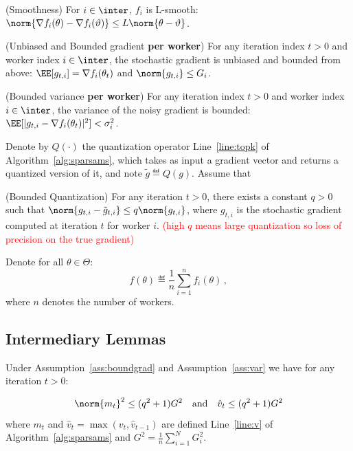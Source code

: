 \documentclass[11pt]{article}
\begin{document}
\begin{assumption}\label{ass:smooth}(Smoothness)
For $i \in \inter$, $f_i$ is  L-smooth: $\norm{\nabla f_i (\theta) - \nabla f_i (\vartheta)} \leq L \norm{\theta-\vartheta}$.
\end{assumption}

\begin{assumption}\label{ass:boundgrad}(Unbiased and Bounded gradient \textbf{per worker})
For any iteration index $t >0$ and worker index $i \in \inter$, the stochastic gradient is unbiased and bounded from above: $\EE[g_{t,i}] = \nabla f_i(\theta_t)$ and $\norm{g_{t,i}} \leq G_i$.
\end{assumption}

\begin{assumption}\label{ass:quant}(Bounded variance \textbf{per worker})
For any iteration index $t >0$ and worker index $i \in \inter$, the variance of the noisy gradient is bounded: $\EE[|g_{t,i} - \nabla f_i(\theta_t)|^2] < \sigma_i^2$.
\end{assumption}

Denote by $Q(\cdot)$ the quantization operator Line~\ref{line:topk} of Algorithm~\ref{alg:sparsams}, which takes as input a gradient vector and returns a quantized version of it, and note $\tilde{g} \eqdef Q(g)$.
Assume that
\begin{assumption}\label{ass:var}(Bounded Quantization)
For any iteration $t >0$, there exists a constant $q >0$ such that $\norm{g_{t,i} - \tilde{g}_{t,i}} \leq q \norm{g_{t,i}}$, where $g_{t,i}$ is the stochastic gradient computed at iteration $t$ for worker $i$. \textcolor{red}{(high $q$ means large quantization so loss of precision on the true gradient)}
\end{assumption}


Denote for all $\theta \in \Theta$:
\begin{equation}\label{eq:obj}
f(\theta) \eqdef  \frac{1}{n} \sum_{i=1}^n f_i(\theta) \, ,
\end{equation} 
where $n$ denotes the number of workers.



\subsection{Intermediary Lemmas}

\begin{Lemma}\label{lem:bound}
Under Assumption~\ref{ass:boundgrad} and Assumption~\ref{ass:var} we have for any iteration $t >0$:

\begin{equation}
\norm{m_t}^2 \leq (q^2+1) G^2 \quad \textrm{and} \quad \hat v_t \leq (q^2+1) G^2
\end{equation}
where $m_t$ and $\hat v_t=\max(v_t,\hat v_{t-1})$ are defined Line~\ref{line:v} of Algorithm~\ref{alg:sparsams} and $G^2 = \frac{1}{n}\sum_{i=1}^N  G_{i}^2$.
\end{Lemma}
\end{document}
